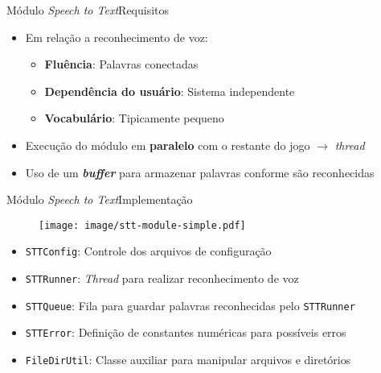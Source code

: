 \begin{frame}{Módulo \textit{Speech to Text}}{Requisitos}

\begin{itemize}
\item Em relação a reconhecimento de voz:

\begin{itemize}
\item<2-> \textbf{Fluência}: Palavras conectadas
\item<3-> \textbf{Dependência do usuário}: Sistema independente
\item<4-> \textbf{Vocabulário}: Tipicamente pequeno
\end{itemize}

\item<5-> Execução do módulo em \textbf{paralelo} com o restante do jogo $\rightarrow$ \textit{thread}

\item<6-> Uso de um \textbf{\textit{buffer}} para armazenar palavras conforme são reconhecidas
\end{itemize}
\end{frame}


\begin{frame}{Módulo \textit{Speech to Text}}{Implementação}

\begin{figure}
\texttt{[image: image/stt-module-simple.pdf]}
\end{figure}

\begin{itemize}
\item<2-> \texttt{STTConfig}: Controle dos arquivos de configuração
\item<3-> \texttt{STTRunner}: \textit{Thread} para realizar reconhecimento de voz
\item<4-> \texttt{STTQueue}: Fila para guardar palavras reconhecidas pelo \texttt{STTRunner}
\item<5-> \texttt{STTError}: Definição de constantes numéricas para possíveis erros
\item<6-> \texttt{FileDirUtil}: Classe auxiliar para manipular arquivos e diretórios
\end{itemize}

\end{frame}
